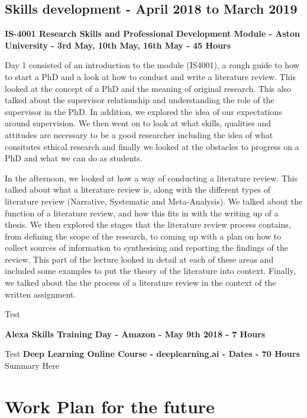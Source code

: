\documentclass{article}
\begin{document}
	\subsection{Skills development - April 2018 to March 2019}
	\textbf{IS-4001 Research Skills and Professional Development Module - Aston University - 3rd May, 10th May, 16th May - 45 Hours} \newline
	\par
	Day 1 consisted of an introduction to the module (IS4001), a rough guide to how to start a PhD and a look at how to conduct and write a literature review. This looked at the concept of a PhD and the meaning of original research. This also talked about the supervisor relationship and understanding the role of the supervisor in the PhD. In addition, we explored the idea of our expectations around supervision. We then went on to look at what skills, qualities and attitudes are necessary to be a good researcher including the idea of what consitutes ethical research and finally we looked at the obstacles to progress on a PhD and what we can do as students.
	\newline
	\par
	In the afternoon, we looked at how a way of conducting a literature review. This talked about what a literature review is, along with the different types of literature review (Narrative, Systematic and Meta-Analysis). We talked about the function of a literature review, and how this fits in with the writing up of a thesis. We then explored the stages that the literature review process contains, from defining the scope of the research, to coming up with a plan on how to collect sources of information to synthesising and reporting the findings of the review. This part of the lecture looked in detail at each of these areas and included some examples to put the theory of the literature into context. Finally, we talked about the the process of a literature review in the context of the written assignment. 
	\newline
	\par
	Test
	\newline
	\par
	\textbf{Alexa Skills Training Day - Amazon - May 9th 2018 - 7 Hours}
	\newline
	\par
	Test
	\newline
	\textbf{Deep Learning Online Course - deeplearning.ai - Dates - 70 Hours}
	Summary Here

	\section{Work Plan for the future}	
\end{document}
